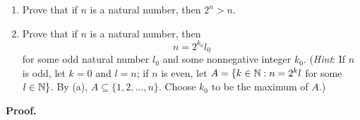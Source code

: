\begin{enumerate}
\begin{enumerate}
                     \item Prove that if $n$ is a natural number, then
                           $2^n > n$.
                     \item Prove that if $n$ is a natural number, then
                           $$n = 2^{k_0}l_0$$
                           for some odd natural number $l_0$ and some
                           nonnegative integer $k_0$. (\textit{Hint}: If $n$ is
                           odd, let $k = 0$ and $l = n$; if $n$ is even, let
                           $A = \{k \in \mathbb{N} : n = 2^kl$ for some $l \in \mathbb{N}\}$.
                           By (a), $A \subseteq \{1, 2, \ldots, n\}$. Choose
                           $k_0$ to be the maximum of $A$.)
                  \end{enumerate}

      \textbf{Proof.}


\end{enumerate}
